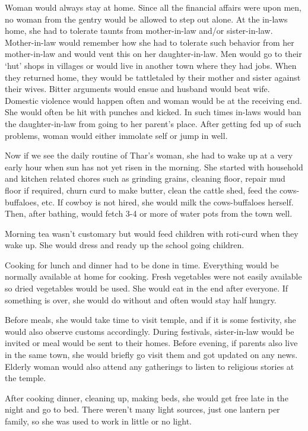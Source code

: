 Woman would always stay at home. Since all the financial affairs were upon men,
no woman from the gentry would be allowed to step out alone. At the in-laws
home, she had to tolerate taunts from mother-in-law and/or sister-in-law.
Mother-in-law would remember how she had to tolerate such behavior from her
mother-in-law and would vent this on her daughter-in-law. Men would go to their
`hut' shops in villages or would live in another town where they had jobs. When
they returned home, they would be tattletaled by their mother and sister
against their wives. Bitter arguments would ensue and husband would beat wife.
Domestic violence would happen often and woman would be at the receiving end.
She would often be hit with punches and kicked. In such times in-laws would ban
the daughter-in-law from going to her parent's place. After getting fed up of
such problems, woman would either immolate self or jump in well.

Now if we see the daily routine of Thar's woman, she had to wake up at a very
early hour when sun has not yet risen in the morning. She started with
household and kitchen related chores such as grinding grains, cleaning floor,
repair mud floor if required, churn curd to make butter, clean the cattle shed,
feed the cows-buffaloes, etc. If cowboy is not hired, she would milk the
cows-buffaloes herself. Then, after bathing, would fetch 3-4 or more of water
pots from the town well.

Morning tea wasn't customary but would feed children with roti-curd when they
wake up. She would dress and ready up the school going children. 

Cooking for lunch and dinner had to be done in time. Everything would be
normally available at home for cooking. Fresh vegetables were not easily
available so dried vegetables would be used. She would eat in the end after
everyone. If something is over, she would do without and often would stay half
hungry.

Before meals, she would take time to visit temple, and if it is some festivity,
she would also observe customs accordingly. During festivals, sister-in-law
would be invited or meal would be sent to their homes. Before evening, if
parents also live in the same town, she would briefly go visit them and got
updated on any news. Elderly woman would also attend any gatherings to listen
to religious stories at the temple.

After cooking dinner, cleaning up, making beds, she would get free late in the
night and go to bed. There weren't many light sources, just one lantern per
family, so she was used to work in little or no light.

